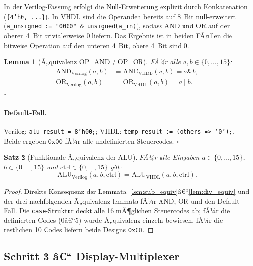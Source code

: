 ﻿\documentclass[12pt,a4paper]{report}
\newtheorem{theorem}{Satz}[section]
\newtheorem{lemma}[theorem]{Lemma}
\begin{document}
In der Verilog-Fassung erfolgt die Null-Erweiterung explizit durch
Konkatenation (\texttt{\{4'h0,~...\}}).  In VHDL sind die Operanden bereits
auf 8~Bit null-erweitert (\texttt{a\_unsigned := "0000" \& unsigned(a\_in)}),
sodass AND und OR auf den oberen 4~Bit trivialerweise 0 liefern.  Das Ergebnis
ist in beiden FÃ¤llen die bitweise Operation auf den unteren 4~Bit, obere
4~Bit sind 0.

\begin{lemma}[Ã„quivalenz OP\_AND / OP\_OR]
	FÃ¼r alle $a, b \in \{0,\ldots,15\}$:
	\begin{align*}
		\mathrm{AND}_\mathrm{Verilog}(a,b) &= \mathrm{AND}_\mathrm{VHDL}(a,b) = a \mathbin{\&} b, \\
		\mathrm{OR}_\mathrm{Verilog}(a,b)  &= \mathrm{OR}_\mathrm{VHDL}(a,b)  = a \mathbin{|} b.
	\end{align*}
	\hfill $\square$
\end{lemma}

\paragraph{Default-Fall.}
Verilog: \texttt{alu\_result = 8'h00;}; VHDL: \texttt{temp\_result := (others => \newline'0');}.
Beide ergeben $\texttt{0x00}$ fÃ¼r alle undefinierten Steuercodes. \hfill $\square$

\begin{theorem}[Funktionale Ã„quivalenz der ALU]
	\label{thm:alu_equiv}
	FÃ¼r alle Eingaben $a \in \{0,\ldots,15\}$, $b \in \{0,\ldots,15\}$ und
	$\mathrm{ctrl} \in \{0,\ldots,15\}$ gilt:
	\[
	\mathrm{ALU}_\mathrm{Verilog}(a, b, \mathrm{ctrl}) =
	\mathrm{ALU}_\mathrm{VHDL}(a, b, \mathrm{ctrl}).
	\]
\end{theorem}

\begin{proof}
	Direkte Konsequenz der Lemmata~\ref{lem:sub_equiv}â€“\ref{lem:div_equiv} und
	der drei nachfolgenden Ã„quivalenz-\newline lemmata fÃ¼r AND, OR und den Default-Fall.
	Die \texttt{case}-Struktur deckt alle 16 mÃ¶glichen Steuercodes ab; fÃ¼r die
	definierten Codes (0â€“5) wurde Ã„quivalenz einzeln bewiesen, fÃ¼r die restlichen
	10 Codes liefern beide Designs $\texttt{0x00}$.
\end{proof}

\subsection{Schritt 3 â€“ Display-Multiplexer}
\label{sssec:display_mux}
\end{document}
